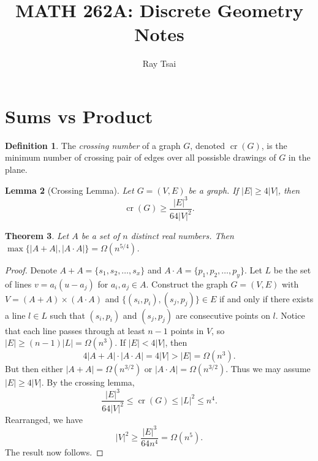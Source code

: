 \documentclass[10pt,reqno]{amsart}
\newtheorem{theorem}{Theorem}[section]
\newtheorem{lemma}[theorem]{Lemma}
\theoremstyle{definition}
\newtheorem{definition}[theorem]{Definition}
\theoremstyle{remark}
\renewcommand{\leq}{\leqslant}
\renewcommand{\geq}{\geqslant}
\def\cr{\operatorname{cr}}
\numberwithin{equation}{section}
\begin{document}
\title[MATH 262A: Discrete Geometry]{MATH 262A: Discrete Geometry Notes}



\author{Ray Tsai}

\onehalfspace

\maketitle

\tableofcontents

\newpage

\section{Sums vs Product}

\begin{definition}
	The \textit{crossing number} of a graph $G$, denoted $\cr(G)$, is the minimum number of crossing pair of edges over all possisble drawings of $G$ in the plane.
\end{definition}

\begin{lemma}[Crossing Lemma]\label{lem:crossing}
	Let $G = (V, E)$ be a graph. If $|E| \geq 4|V|$, then
	\[
		\cr(G) \geq \frac{|E|^3}{64|V|^2}.
	\]
\end{lemma}

\begin{theorem}\label{thm:sumprod}
	Let $A$ be a set of $n$ distinct real numbers. Then $\max\{|A + A|, |A \cdot A|\} = \Omega(n^{5/4})$.
\end{theorem}

\begin{proof}
	Denote $A + A = \{s_1, s_2, \ldots, s_x\}$ and $A \cdot A = \{p_1, p_2, \ldots, p_y\}$. Let $L$ be the set of lines $v = a_i(u - a_j)$ for $a_i, a_j \in A$. Construct the graph $G = (V, E)$ with $V = (A + A) \times (A \cdot A)$ and $\{(s_i, p_i), (s_j, p_j)\} \in E$ if and only if there exists a line $l \in L$ such that $(s_i, p_i)$ and $(s_j, p_j)$ are consecutive points on $l$. Notice that each line passes through at least $n - 1$ points in $V$, so $|E| \geq (n - 1)|L| = \Omega(n^3)$. If $|E| < 4|V|$, then 
	\[
		4|A + A| \cdot |A \cdot A| = 4|V| > |E| = \Omega(n^3).
	\]
	But then either $|A + A| = \Omega(n^{3/2})$ or $|A \cdot A| = \Omega(n^{3/2})$. Thus we may assume $|E| \geq 4|V|$. By the crossing lemma, 
	\[
		\frac{|E|^3}{64|V|^2} \leq \cr(G) \leq |L|^2 \leq n^4.
	\]
	Rearranged, we have
	\[
		|V|^2 \geq \frac{|E|^{3}}{64n^4} = \Omega(n^{5}).
	\]
	The result now follows.
\end{proof}
\end{document}
